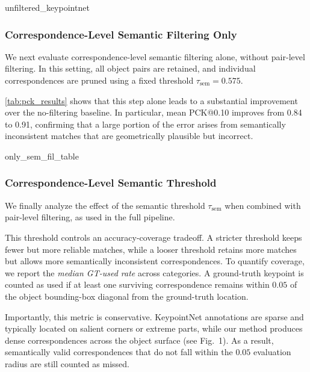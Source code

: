 {unfiltered_keypointnet}

\subsubsection{Correspondence-Level Semantic Filtering Only}
\label{sup:only_corr_filtering}

We next evaluate correspondence-level semantic filtering alone, without pair-level filtering. In this setting, all object pairs are retained, and individual correspondences are pruned using a fixed threshold $\tau_{\mathrm{sem}}=0.575$.

\autoref{tab:pck_results} shows that this step alone leads to a substantial improvement over the no-filtering baseline. In particular, mean PCK@0.10 improves from 0.84 to 0.91, confirming that a large portion of the error arises from semantically inconsistent matches that are geometrically plausible but incorrect.

{only_sem_fil_table}

\subsubsection{Correspondence-Level Semantic Threshold}
\label{sup:ablation_semantic_threshold_corr}

We finally analyze the effect of the semantic threshold $\tau_{\mathrm{sem}}$ when combined with pair-level filtering, as used in the full pipeline.

This threshold controls an accuracy-coverage tradeoff. A stricter threshold keeps fewer but more reliable matches, while a looser threshold retains more matches but allows more semantically inconsistent correspondences. To quantify coverage, we report the \emph{median GT-used rate} across categories. A ground-truth keypoint is counted as used if at least one surviving correspondence remains within $0.05$ of the object bounding-box diagonal from the ground-truth location.

Importantly, this metric is conservative. KeypointNet annotations are sparse and typically located on salient corners or extreme parts, while our method produces dense correspondences across the object surface (see Fig.~1). As a result, semantically valid correspondences that do not fall within the $0.05$ evaluation radius are still counted as missed.

